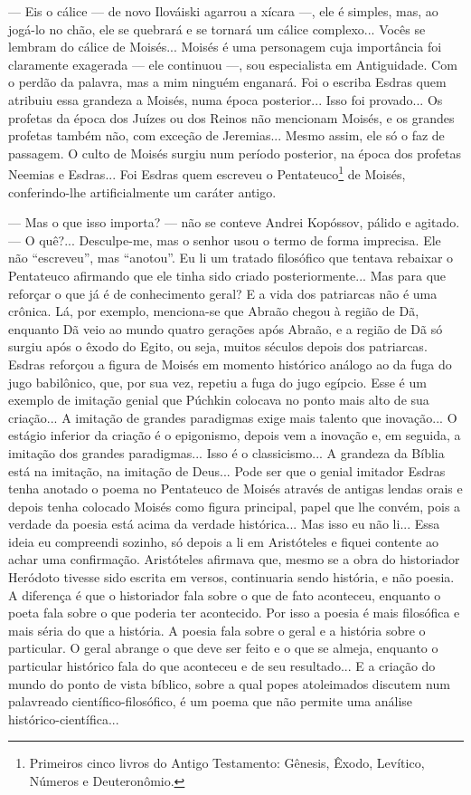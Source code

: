 --- Eis o cálice --- de novo Ilováiski agarrou a xícara ---, ele é
simples, mas, ao jogá-lo no chão, ele se quebrará e se tornará um cálice
complexo... Vocês se lembram do cálice de Moisés... Moisés é uma
personagem cuja importância foi claramente exagerada --- ele continuou
---, sou especialista em Antiguidade. Com o perdão da palavra, mas a mim
ninguém enganará. Foi o escriba Esdras quem atribuiu essa grandeza a
Moisés, numa época posterior... Isso foi provado... Os profetas da época
dos Juízes ou dos Reinos não mencionam Moisés, e os grandes profetas
também não, com exceção de Jeremias... Mesmo assim, ele só o faz de
passagem. O culto de Moisés surgiu num período posterior, na época dos
profetas Neemias e Esdras... Foi Esdras quem escreveu o
Pentateuco\footnote{Primeiros cinco livros do Antigo Testamento:
  Gênesis, Êxodo, Levítico, Números e Deuteronômio.} de Moisés,
conferindo-lhe artificialmente um caráter antigo.

--- Mas o que isso importa? --- não se conteve Andrei Kopóssov, pálido e
agitado. --- O quê?... Desculpe-me, mas o senhor usou o termo de forma
imprecisa. Ele não ``escreveu'', mas ``anotou''. Eu li um tratado
filosófico que tentava rebaixar o Pentateuco afirmando que ele tinha
sido criado posteriormente... Mas para que reforçar o que já é de
conhecimento geral? E a vida dos patriarcas não é uma crônica. Lá, por
exemplo, menciona-se que Abraão chegou à região de Dã, enquanto Dã veio
ao mundo quatro gerações após Abraão, e a região de Dã só surgiu após o
êxodo do Egito, ou seja, muitos séculos depois dos patriarcas. Esdras
reforçou a figura de Moisés em momento histórico análogo ao da fuga do
jugo babilônico, que, por sua vez, repetiu a fuga do jugo egípcio. Esse
é um exemplo de imitação genial que Púchkin colocava no ponto mais alto
de sua criação... A imitação de grandes paradigmas exige mais talento
que inovação... O estágio inferior da criação é o epigonismo, depois vem
a inovação e, em seguida, a imitação dos grandes paradigmas... Isso é o
classicismo... A grandeza da Bíblia está na imitação, na imitação de
Deus... Pode ser que o genial imitador Esdras tenha anotado o poema no
Pentateuco de Moisés através de antigas lendas orais e depois tenha
colocado Moisés como figura principal, papel que lhe convém, pois a
verdade da poesia está acima da verdade histórica... Mas isso eu não
li... Essa ideia eu compreendi sozinho, só depois a li em Aristóteles e
fiquei contente ao achar uma confirmação. Aristóteles afirmava que,
mesmo se a obra do historiador Heródoto tivesse sido escrita em versos,
continuaria sendo história, e não poesia. A diferença é que o
historiador fala sobre o que de fato aconteceu, enquanto o poeta fala
sobre o que poderia ter acontecido. Por isso a poesia é mais filosófica
e mais séria do que a história. A poesia fala sobre o geral e a história
sobre o particular. O geral abrange o que deve ser feito e o que se
almeja, enquanto o particular histórico fala do que aconteceu e de seu
resultado... E a criação do mundo do ponto de vista bíblico, sobre a
qual popes atoleimados discutem num palavreado científico-filosófico, é
um poema que não permite uma análise histórico-científica...

